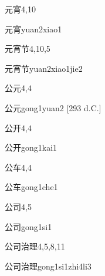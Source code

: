 \begin{entry}{元宵}{4,10}
  \begin{phonetics}{元宵}{yuan2xiao1}
  \end{phonetics}
\end{entry}

\begin{entry}{元宵节}{4,10,5}
  \begin{phonetics}{元宵节}{yuan2xiao1jie2}
  \end{phonetics}
\end{entry}

\begin{entry}{公元}{4,4}
  \begin{phonetics}{公元}{gong1yuan2}
    [293 d.C.]
  \end{phonetics}
\end{entry}

\begin{entry}{公开}{4,4}
  \begin{phonetics}{公开}{gong1kai1}
  \end{phonetics}
\end{entry}

\begin{entry}{公车}{4,4}
  \begin{phonetics}{公车}{gong1che1}
  \end{phonetics}
\end{entry}

\begin{entry}{公司}{4,5}
  \begin{phonetics}{公司}{gong1si1}
  \end{phonetics}
\end{entry}

\begin{entry}{公司治理}{4,5,8,11}
  \begin{phonetics}{公司治理}{gong1si1zhi4li3}
  \end{phonetics}
\end{entry}

